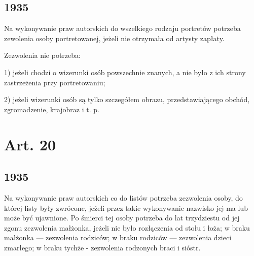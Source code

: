 \documentclass[withmarginpar]{book}
\begin{document}
\subsection{1935}
\label{sec:art.-19-1}

Na wykonywanie praw autorskich do wszelkiego rodzaju portretów
potrzeba zewolenia osoby portretowanej, jeżeli nie otrzymała od
artysty zapłaty.

Zezwolenia nie potrzeba:

1) jeżeli chodzi o wizerunki osób powszechnie znanych, a nie było z ich strony zastrzeżenia przy portretowaniu;

2) jeżeli wizerunki osób są tylko szczegółem obrazu, przedstawiającego obchód, zgromadzenie, krajobraz i t. p.

\section{Art. 20}
\label{sec:art.-20}
\subsection{1935}
\label{sec:art.-20-1}

Na wykonywanie praw autorskich co do listów potrzeba zezwolenia osoby,
do której listy były zwrócone, jeżeli przez takie wykonywanie nazwisko
jej ma lub może być ujawnione. Po śmierci tej osoby potrzeba do lat
trzydziestu od jej zgonu zezwolenia małżonka, jeżeli nie było
rozłączenia od stołu i łoża; w braku małżonka — zezwolenia rodziców; w
braku rodziców — zezwolenia dzieci zmarłego; w braku tychże -
zezwolenia rodzonych braci i sióstr.
\end{document}
